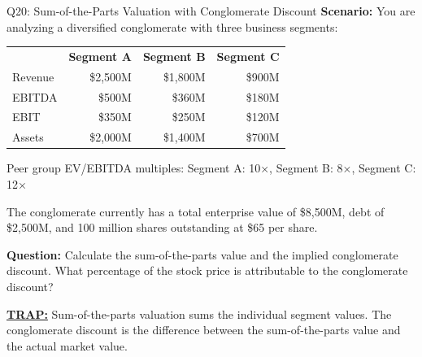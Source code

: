 \documentclass{beamer}
\renewcommand{\scriptsize}{\fontsize{6pt}{7pt}\selectfont}
\begin{document}
	\begin{frame}{Q20: Sum-of-the-Parts Valuation with Conglomerate Discount}
		\scriptsize
		\textbf{Scenario:} You are analyzing a diversified conglomerate with three business segments:
		
		\begin{tabular}{lrrr}
			& \textbf{Segment A} & \textbf{Segment B} & \textbf{Segment C} \\
			Revenue & \$2,500M & \$1,800M & \$900M \\
			EBITDA & \$500M & \$360M & \$180M \\
			EBIT & \$350M & \$250M & \$120M \\
			Assets & \$2,000M & \$1,400M & \$700M \\
		\end{tabular}
		
		Peer group EV/EBITDA multiples: Segment A: 10×, Segment B: 8×, Segment C: 12×
		
		The conglomerate currently has a total enterprise value of \$8,500M, debt of \$2,500M, and 100 million shares outstanding at \$65 per share.
		
		\textbf{Question:} Calculate the sum-of-the-parts value and the implied conglomerate discount. What percentage of the stock price is attributable to the conglomerate discount?
		
		\vspace{2pt}
		\underline{\textbf{TRAP:}} Sum-of-the-parts valuation sums the individual segment values. The conglomerate discount is the difference between the sum-of-the-parts value and the actual market value.
	\end{frame}
	
\end{document}
